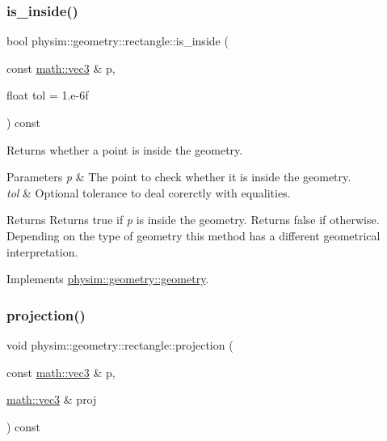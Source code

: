 \subsubsection{\texorpdfstring{is\+\_\+inside()}{is\_inside()}}
{\footnotesize\ttfamily bool physim\+::geometry\+::rectangle\+::is\+\_\+inside (\begin{DoxyParamCaption}\item[{const \hyperlink{structphysim_1_1math_1_1vec3}{math\+::vec3} \&}]{p,  }\item[{float}]{tol = {\ttfamily 1.e-\/6f} }\end{DoxyParamCaption}) const\hspace{0.3cm}{\ttfamily [virtual]}}



Returns whether a point is inside the geometry. 


\begin{DoxyParams}{Parameters}
{\em p} & The point to check whether it is inside the geometry. \\
\hline
{\em tol} & Optional tolerance to deal corerctly with equalities. \\
\hline
\end{DoxyParams}
\begin{DoxyReturn}{Returns}
Returns true if {\itshape p} is inside the geometry. Returns false if otherwise. Depending on the type of geometry this method has a different geometrical interpretation. 
\end{DoxyReturn}


Implements \hyperlink{classphysim_1_1geometry_1_1geometry_a8ae67bba78a06e3c41b7f5b5903b897d}{physim\+::geometry\+::geometry}.

\mbox{\label{classphysim_1_1geometry_1_1rectangle_a4875012aa1b9c510e23b62f090acac23}} 
\subsubsection{\texorpdfstring{projection()}{projection()}}
{\footnotesize\ttfamily void physim\+::geometry\+::rectangle\+::projection (\begin{DoxyParamCaption}\item[{const \hyperlink{structphysim_1_1math_1_1vec3}{math\+::vec3} \&}]{p,  }\item[{\hyperlink{structphysim_1_1math_1_1vec3}{math\+::vec3} \&}]{proj }\end{DoxyParamCaption}) const}



